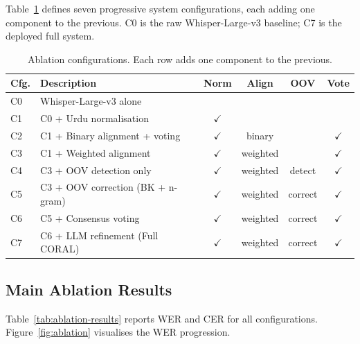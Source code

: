 Table~\ref{tab:ablation-configs} defines seven progressive system configurations, each adding one component to the previous. C0 is the raw Whisper-Large-v3 baseline; C7 is the deployed full system.

\begin{table}[h]
    \centering
    \renewcommand{\arraystretch}{1.30}
    \begin{tabularx}{\textwidth}{lXcccc}
    \toprule
    \textbf{Cfg.} & \textbf{Description} & \textbf{Norm} & \textbf{Align} & \textbf{OOV} & \textbf{Vote} \\
    \midrule
    C0 & Whisper-Large-v3 alone           &              &                  &              &              \\
    C1 & C0 + Urdu normalisation          & $\checkmark$ &                  &              &              \\
    C2 & C1 + Binary alignment + voting   & $\checkmark$ & binary           &              & $\checkmark$ \\
    C3 & C1 + Weighted alignment          & $\checkmark$ & weighted         &              & $\checkmark$ \\
    C4 & C3 + OOV detection only          & $\checkmark$ & weighted         & detect       & $\checkmark$ \\
    C5 & C3 + OOV correction (BK + n-gram) & $\checkmark$ & weighted         & correct      & $\checkmark$ \\
    C6 & C5 + Consensus voting            & $\checkmark$ & weighted         & correct      & $\checkmark$ \\
    C7 & C6 + LLM refinement (Full CORAL) & $\checkmark$ & weighted         & correct      & $\checkmark$ \\
    \bottomrule
    \end{tabularx}
    \caption{Ablation configurations. Each row adds one component to the previous.}
    \label{tab:ablation-configs}
\end{table}

\subsection{Main Ablation Results}
\label{ssec:ablation-results}

Table~\ref{tab:ablation-results} reports WER and CER for all configurations. Figure~\ref{fig:ablation} visualises the WER progression.

